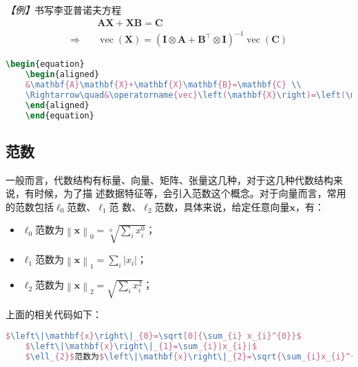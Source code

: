 \emph{【例】}书写李亚普诺夫方程
\begin{equation}
    \begin{aligned}
                         & \mathbf{A}\mathbf{X}+\mathbf{X}\mathbf{B}=\mathbf{C}                                                                                                                \\
        \Rightarrow\quad & \operatorname{vec}\left(\mathbf{X}\right)=\left(\mathbf{I}\otimes\mathbf{A}+\mathbf{B}^{\top}\otimes\mathbf{I}\right)^{-1}\operatorname{vec}\left(\mathbf{C}\right)
    \end{aligned}
\end{equation}
\begin{lstlisting}[language=TeX]
    \begin{equation}
    \begin{aligned}
    &\mathbf{A}\mathbf{X}+\mathbf{X}\mathbf{B}=\mathbf{C} \\
    \Rightarrow\quad&\operatorname{vec}\left(\mathbf{X}\right)=\left(\mathbf{I}\otimes\mathbf{A}+\mathbf{B}^{\top}\otimes\mathbf{I}\right)^{-1}\operatorname{vec}\left(\mathbf{C}\right)
    \end{aligned}
    \end{equation}
\end{lstlisting}

\subsection{范数}
一般而言，代数结构有标量、向量、矩阵、张量这几种，对于这几种代数结构来说，有时候，为了描
述数据特征等，会引入范数这个概念。对于向量而言，常用的范数包括$\ell_{0}$范数、$\ell_{1}$范
数、$\ell_{2}$范数，具体来说，给定任意向量$\mathbf{x}$，有：
\begin{itemize}
    \item $\ell_{0}$范数为$\left\|\mathbf{x}\right\|_{0}=\sqrt[0]{\sum_{i} x_{i}^{0}}$；
    \item $\ell_{1}$范数为$\left\|\mathbf{x}\right\|_{1}=\sum_{i}|x_{i}|$；
    \item $\ell_{2}$范数为$\left\|\mathbf{x}\right\|_{2}=\sqrt{\sum_{i}x_{i}^{2}}$；
\end{itemize}
上面的相关代码如下：
\begin{lstlisting}[language=TeX]
    $\left\|\mathbf{x}\right\|_{0}=\sqrt[0]{\sum_{i} x_{i}^{0}}$            % 范数ℓ0
    $\left\|\mathbf{x}\right\|_{1}=\sum_{i}|x_{i}|$                         % 范数ℓ1
    $\ell_{2}$范数为$\left\|\mathbf{x}\right\|_{2}=\sqrt{\sum_{i}x_{i}^{2}}$ % 范数ℓ2
\end{lstlisting}

